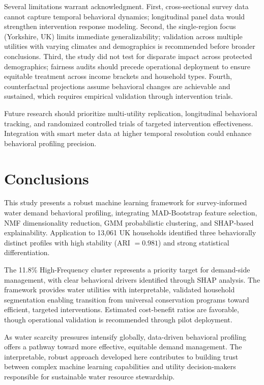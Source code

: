 \documentclass[a4paper,12pt]{article}
\begin{document}
Several limitations warrant acknowledgment. First, cross-sectional survey data cannot capture temporal behavioral dynamics; longitudinal panel data would strengthen intervention response modeling. Second, the single-region focus (Yorkshire, UK) limits immediate generalizability; validation across multiple utilities with varying climates and demographics is recommended before broader conclusions. Third, the study did not test for disparate impact across protected demographics; fairness audits should precede operational deployment to ensure equitable treatment across income brackets and household types. Fourth, counterfactual projections assume behavioral changes are achievable and sustained, which requires empirical validation through intervention trials.

Future research should prioritize multi-utility replication, longitudinal behavioral tracking, and randomized controlled trials of targeted intervention effectiveness. Integration with smart meter data at higher temporal resolution could enhance behavioral profiling precision.

\section{Conclusions}

This study presents a robust machine learning framework for survey-informed water demand behavioral profiling, integrating MAD-Bootstrap feature selection, NMF dimensionality reduction, GMM probabilistic clustering, and SHAP-based explainability. Application to 13,061 UK households identified three behaviorally distinct profiles with high stability (ARI $= 0.981$) and strong statistical differentiation.

The 11.8\% High-Frequency cluster represents a priority target for demand-side management, with clear behavioral drivers identified through SHAP analysis. The framework provides water utilities with interpretable, validated household segmentation enabling transition from universal conservation programs toward efficient, targeted interventions. Estimated cost-benefit ratios are favorable, though operational validation is recommended through pilot deployment.

As water scarcity pressures intensify globally, data-driven behavioral profiling offers a pathway toward more effective, equitable demand management. The interpretable, robust approach developed here contributes to building trust between complex machine learning capabilities and utility decision-makers responsible for sustainable water resource stewardship.
\end{document}
